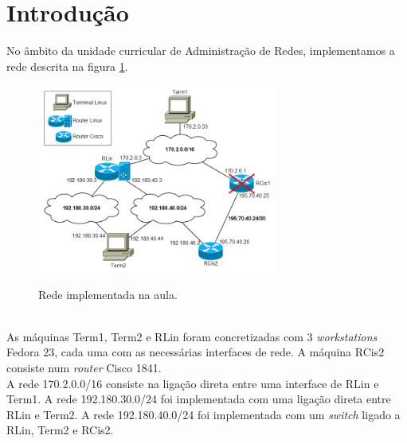 \section*{Introdução}

No âmbito da unidade curricular de Administração de Redes, implementamos a rede descrita na figura \ref{fig:rede}.\\
\begin{figure}[h]
\centering
\includegraphics[width=0.7\textwidth]{rede.png}
\label{fig:rede}
\caption{Rede implementada na aula.}
\end{figure}
\\
As máquinas \textsf{Term1}, \textsf{Term2} e \textsf{RLin} foram concretizadas com 3 \emph{workstations} Fedora 23, cada uma com as necessárias interfaces de rede. A máquina \textsf{RCis2} consiste num \emph{router} Cisco 1841.\\
A rede \textsf{170.2.0.0/16} consiste na ligação direta entre uma interface de \textsf{RLin} e \textsf{Term1}.
A rede \textsf{192.180.30.0/24} foi implementada com uma ligação direta entre \textsf{RLin} e \textsf{Term2}.
A rede \textsf{192.180.40.0/24} foi implementada com um \emph{switch} ligado a \textsf{RLin}, \textsf{Term2} e \textsf{RCis2}. 
